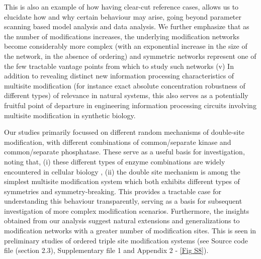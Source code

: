 \documentclass[9pt,lineno]{elife}
\begin{document}
This is also an example of how having clear-cut reference cases, allows us to elucidate how and why certain behaviour may arise, going beyond parameter scanning based model analysis and data analysis. We further emphasize that as the number of modifications increases, the underlying modification networks become considerably more complex (with an exponential increase in the size of the network, in the absence of ordering) and symmetric networks represent
one of the few tractable vantage points from which to study such networks
(v) In addition to revealing distinct new information processing characteristics of multisite modification (for instance exact absolute concentration robustness of different types) of relevance in natural systems, this also serves as a potentially fruitful point of departure in engineering information processing circuits involving multisite modification in synthetic biology.

Our studies primarily focussed on different random mechanisms of double-site modification, with different combinations of common/separate kinase and common/separate phosphatase. These serve as a useful basis for investigation, noting that, (i) these different types of enzyme combinations are widely encountered in cellular biology \cite{Stepanov2018, Lyons2013, Ramachandran1992}, (ii) the double site mechanism is among the simplest multisite modification system which both exhibits different types of symmetries and symmetry-breaking. This provides a tractable case for understanding this behaviour transparently, serving as a basis for subsequent investigation of more complex modification scenarios. Furthermore, the insights obtained from our analysis suggest natural extensions and generalizations to  modification networks with a greater number of modification sites. This is seen in preliminary studies of ordered triple site modification systems (see Source code file (section 2.3), Supplementary file 1 and Appendix 2 - \cref{Fig S8}). 
\end{document}
